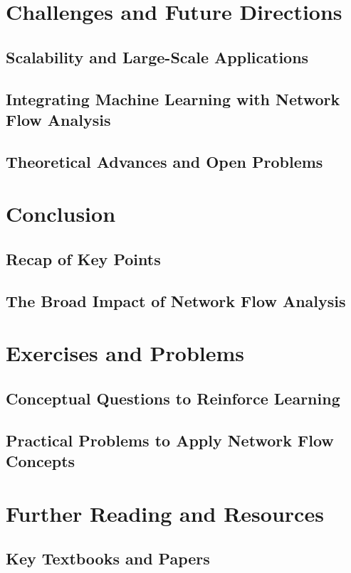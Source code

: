 \documentclass[12pt]{book} %
\begin{document}
\section{Challenges and Future Directions}
\subsection{Scalability and Large-Scale Applications}
\subsection{Integrating Machine Learning with Network Flow Analysis}
\subsection{Theoretical Advances and Open Problems}

\section{Conclusion}
\subsection{Recap of Key Points}
\subsection{The Broad Impact of Network Flow Analysis}

\section{Exercises and Problems}
\subsection{Conceptual Questions to Reinforce Learning}
\subsection{Practical Problems to Apply Network Flow Concepts}

\section{Further Reading and Resources}
\subsection{Key Textbooks and Papers}
\end{document}
